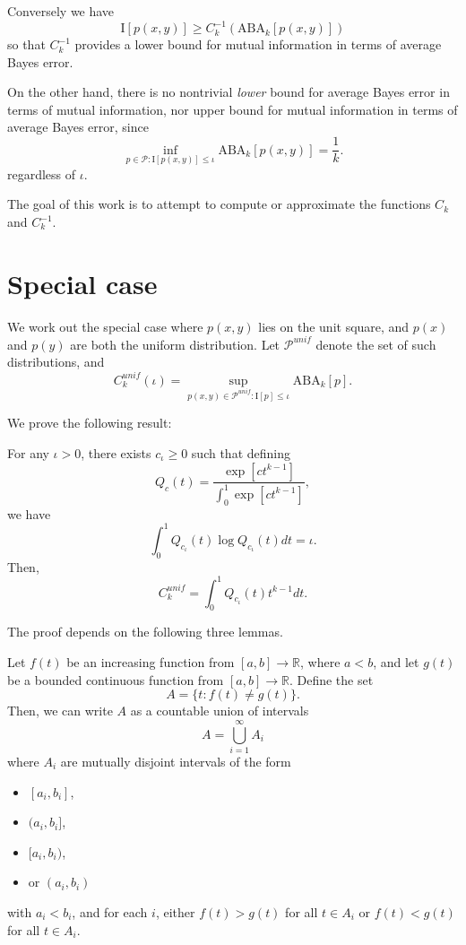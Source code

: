 \documentclass[12pt]{article}
\begin{document}
Conversely we have
\[
\text{I}[p(x,y)] \geq C^{-1}_k(\text{ABA}_k[p(x,y)])
\]
so that $C^{-1}_k$ provides a lower bound for mutual information in terms of average Bayes error.

On the other hand, there is no nontrivial \emph{lower} bound for average Bayes error in terms of mutual information,
nor upper bound for mutual information in terms of average Bayes error, since
\[
\inf_{p \in \mathcal{P}: \text{I}[p(x,y)] \leq \iota} \text{ABA}_k[p(x,y)] = \frac{1}{k}.
\]
regardless of $\iota$.

The goal of this work is to attempt to compute or approximate the functions $C_k$ and $C_k^{-1}$.

\section{Special case}

We work out the special case where $p(x,y)$ lies on the unit square, and $p(x)$ and $p(y)$ are both the uniform distribution.
Let $\mathcal{P}^{unif}$ denote the set of such distributions, and 
\[
C_k^{unif}(\iota) = \sup_{p(x, y) \in \mathcal{P}^{unif}: \text{I}[p] \leq \iota} \text{ABA}_k[p]. 
\]

We prove the following result:

\begin{theorem}
For any $\iota > 0$, there exists $c_\iota \geq 0$ such that defining
\[
Q_c(t) = \frac{\exp[ct^{k-1}]}{\int_0^1 \exp[ct^{k-1}]},
\]
we have
\[
\int_0^1 Q_{c_\iota}(t) \log Q_{c_\iota}(t) dt = \iota.
\]
Then,
\[
C_k^{unif} = \int_0^1 Q_{c_\iota}(t) t^{k-1} dt.
\]
\end{theorem}

The proof depends on the following three lemmas.

\begin{lemma}
Let $f(t)$ be an increasing function from $[a, b] \to \mathbb{R}$, where $a < b$,
and let $g(t)$ be a bounded continuous function from $[a, b] \to \mathbb{R}$.
Define the set
\[
A = \{t: f(t) \neq g(t)\}.
\]
Then, we can write $A$ as a countable union of intervals
\[
A = \bigcup_{i=1}^\infty A_i
\]
where $A_i$ are mutually disjoint intervals of the form
\begin{itemize}
\item $[a_i, b_i]$,
\item $(a_i, b_i]$,
\item $[a_i, b_i)$,
\item or $(a_i, b_i)$
\end{itemize}
with $a_i < b_i$, and for each $i$, either $f(t) > g(t)$ for all $t \in A_i$ or $f(t) < g(t)$ for all $t \in A_i$.
\end{lemma}
\end{document}
